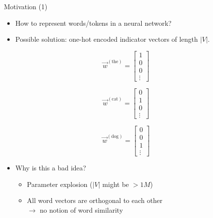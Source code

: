 \documentclass[11pt,compress,t,notes=noshow, xcolor=table]{beamer}
\begin{document}


\begin{vbframe}{Motivation (1)}

\vfill

\begin{itemize}
	\item How to represent words/tokens in a neural network?
	\item Possible solution: one-hot encoded indicator vectors of length $|V|$.
\end{itemize}

\begin{center}
\begin{minipage}{.2\textwidth}
	\[\vec w^{({\text{the}})} =
	\begin{bmatrix}
	1 \\ 0 \\ 0 \\ \vdots
	\end{bmatrix}
	\]
\end{minipage}
\begin{minipage}{.2\textwidth}
	\[\vec w^{({\text{cat}})} =
	\begin{bmatrix}
	0 \\ 1 \\ 0 \\ \vdots
	\end{bmatrix}
	\]
\end{minipage}
\begin{minipage}{.2\textwidth}
\[\vec w^{({\text{dog}})} =
\begin{bmatrix}
0 \\ 0 \\ 1 \\ \vdots
\end{bmatrix}
\]
\end{minipage}
\end{center}

\begin{itemize}
	\item \ques Why is this a bad idea?
		\begin{itemize}
			\item Parameter explosion ($|V|$ might be $> 1M$)
			\item All word vectors are orthogonal to each other\\$\rightarrow$ no notion of word similarity
		\end{itemize}
\end{itemize}

\vfill

\end{vbframe}
\end{document}
